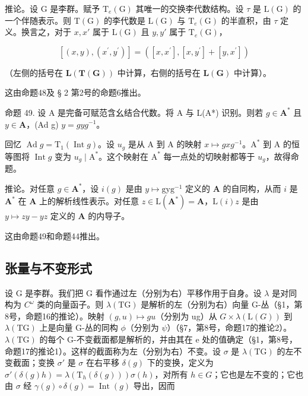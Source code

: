 推论。设 G 是李群。赋予 \(\mathrm{T}_{e}(\mathrm{G})\) 其唯一的交换李代数结构。设 \(\tau\) 是 \(\mathrm{L}(\mathrm{G})\) 的一个伴随表示。则 \(\mathrm{T}(\mathrm{G})\) 的李代数是 \(\mathrm{L}(\mathrm{G})\) 与 \(\mathrm{T}_{e}(\mathrm{G})\) 的半直积，由 \(\tau\) 定义。换言之，对于 \(x, x'\) 属于 \(\mathrm{L}(\mathrm{G})\) 且 \(y, y'\) 属于 \(\mathrm{T}_{e}(\mathrm{G})\)，

\[
[ (x, y), (x ^ {\prime}, y ^ {\prime}) ] = ([ x, x ^ {\prime} ], [ x, y ^ {\prime} ] + [ y, x ^ {\prime} ])
\]

（左侧的括号在 \(\mathbf{L}(\mathbf{T}(\mathbf{G}))\) 中计算，右侧的括号在 \(\mathbf{L}(\mathbf{G})\) 中计算）。

这由命题48及 § 2 第2号的命题6推出。

命题 49. 设 A 是完备可赋范含幺结合代数。将 A 与 L(A*) 识别。则若 \(g \in \mathbf{A}^*\) 且 \(y \in \mathbf{A}\)，(Ad g) \(y = gyg^{-1}\)。

回忆 \(\operatorname{Ad} g = \mathrm{T}_{1}(\operatorname{Int} g)\)。设 \(u_{g}\) 是从 A 到 A 的映射 \(x \mapsto gxg^{-1}\)。\(\mathrm{A}^{*}\) 到 A 的恒等图将 \(\operatorname{Int} g\) 变为 \(u_{g} \mid \mathrm{A}^{*}\)。这个映射在 \(\mathrm{A}^{*}\) 每一点处的切映射都等于 \(u_{g}\)，故得命题。

推论。对任意 \(g \in \mathbf{A}^*\)，设 \(i(g)\) 是由 \(y \mapsto \mathrm{gyg}^{-1}\) 定义的 \(\mathbf{A}\) 的自同构，从而 \(i\) 是 \(\mathbf{A}^*\) 在 \(\mathbf{A}\) 上的解析线性表示。对任意 \(z \in \mathrm{L}(\mathbf{A}^*) = \mathbf{A}\)，\(\mathrm{L}(i)z\) 是由 \(y \mapsto zy - yz\) 定义的 \(\mathbf{A}\) 的内导子。

这由命题49和命题44推出。

\subsection{张量与不变形式}

设 G 是李群。我们把 G 看作通过左（分别为右）平移作用于自身。设 \(\lambda\) 是对同构为 \(C^{\omega}\) 类的向量函子。则 \(\lambda(\mathrm{TG})\) 是解析的左（分别为右）向量 G-丛（§1，第8号，命题16的推论）。映射 \((g, u) \mapsto gu\)（分别为 ug）从 \(G \times \lambda(\mathrm{L}(G))\) 到 \(\lambda(\mathrm{TG})\) 上是向量 G-丛的同构 \(\phi\)（分别为 \(\psi\)）（§7，第8号，命题17的推论2）。\(\lambda(\mathrm{TG})\) 的每个 G-不变截面都是解析的，并由其在 e 处的值确定（§1，第8号，命题17的推论1）。这样的截面称为左（分别为右）不变。设 \(\sigma\) 是 \(\lambda(\mathrm{TG})\) 的左不变截面；变换 \(\sigma'\) 是 \(\sigma\) 在右平移 \(\delta(g)\) 下的变换，定义为 \(\sigma'(\delta(g)h) = \lambda(\mathrm{T}_{h}(\delta(g)))\sigma(h)\)，对所有 \(h \in G\)；它也是左不变的；它也由 \(\sigma\) 经 \(\gamma(g) \circ \delta(g) = \operatorname{Int}(g)\) 导出，因而


